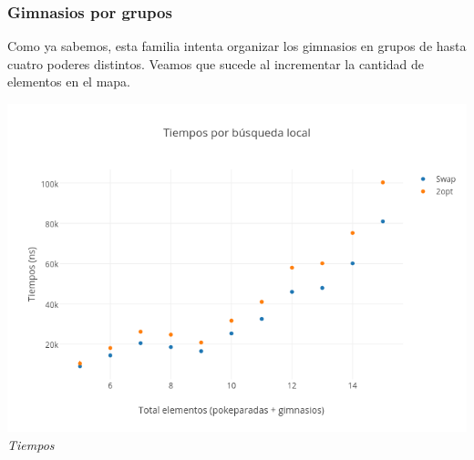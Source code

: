 \subsubsection*{Gimnasios por grupos}

Como ya sabemos, esta familia intenta organizar los gimnasios en grupos de hasta cuatro poderes distintos. Veamos que sucede al incrementar la cantidad de elementos en el mapa.

\begin{figure}[h] 
 \centering
       \label{fig:gruposDist1}
    \label{fig:gruposMejora1}
    \end{figure}
 
   \vspace*{0.3cm} \vspace*{0.3cm}
  \begin{center}
	\includegraphics[scale=0.50]{./EJ3/tiemposLocales20cuadM.png}
	\label{fig:gruposTiempos1}	
	\\{\textit{Tiempos}}
  \end{center}
  \vspace*{0.3cm} 

